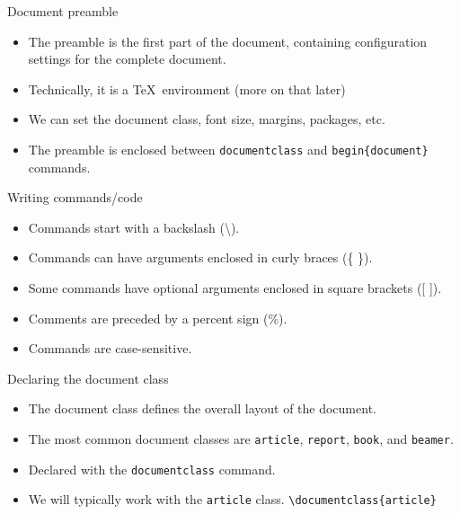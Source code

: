 \documentclass[t,12pt,xcolor=dvipsnames]{beamer}
\begin{document}
\begin{frame}{Document preamble}
    \begin{itemize}
        \item The preamble is the first part of the document, containing configuration settings for the complete document.
        \item Technically, it is a \TeX \ environment (more on that later)
        \item We can set the document class, font size, margins, packages, etc.
        \item The preamble is enclosed between \texttt{documentclass} and \texttt{begin\{document\}} commands.
    \end{itemize}
\end{frame}

\begin{frame}{Writing commands/code}
    \begin{itemize}
        \item Commands start with a backslash (\textbackslash).
        \item Commands can have arguments enclosed in curly braces (\{ \}).
        \item Some commands have optional arguments enclosed in square brackets ([ ]).
        \item Comments are preceded by a percent sign (\%).
        \item Commands are case-sensitive.
    \end{itemize}
\end{frame}

\begin{frame}{Declaring the document class}
    \begin{itemize}
        \item The document class defines the overall layout of the document.
        \item The most common document classes are \texttt{article}, \texttt{report}, \texttt{book}, and \texttt{beamer}.
        \item Declared with the \texttt{documentclass} command.
        \item We will typically work with the \texttt{article} class.
    \texttt{\textbackslash documentclass\{article\}}
    \end{itemize}
\end{frame}
\end{document}
